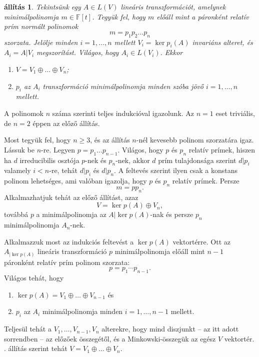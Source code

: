 \documentclass[a4paper, showtrims]{memoir}
\makeatletter
\renewenvironment{proof}[1][\proofname]
    {\par\pushQED{\qed}%
    \normalfont \topsep6\p@\@plus6\p@\relax
    \trivlist
    \item[\hskip\labelsep
        \itshape
    #1\@addpunct{:}]\ignorespaces}
    {\popQED\endtrivlist\@endpefalse}
\theoremstyle{plain}
\newtheorem{proposition}{állítás}[chapter]
\theoremstyle{remark}
\theoremstyle{definition}
\makeatother
\begin{document}
\begin{proposition}\label{pr:redukcio-primszorzat}
	Tekintsünk egy $A\in L\left( V \right)$ lineáris transzformációt,
	amelynek minimálpolinomja $m\in\mathbb{F}\left[ t \right]$.
	Tegyük fel, hogy $m$ előáll mint a páronként relatív prím
	normált polinomok
	\[
		m=p_1p_2\ldots p_n
	\]
	szorzata.
	Jelölje minden $i=1,\ldots,n$ mellett $V_i=\ker p_i\left( A \right)$
	invariáns alteret, és $A_i=A|V_i$ megszorítást.
	Világos, hogy $A_i\in L\left( V_i \right)$.
	Ekkor
	\begin{enumerate}
		\item $V=V_1\oplus\ldots\oplus V_n$;
		\item $p_i$ az $A_i$ transzformáció minimálpolinomja minden szóba jövő
		      $i=1,\ldots,n$ mellett.\qedhere
	\end{enumerate}
\end{proposition}
\begin{proof}
	A polinomok $n$ száma szerinti teljes indukcióval igazolunk.
	Az $n=1$ eset triviális, de $n=2$ éppen az előző állítás.

	Most tegyük fel, hogy $n\geq 3$, és az állítás $n$-nél kevesebb polinom szorzatára igaz.
	Lássuk be $n$-re.
	Legyen $p=p_1\ldots p_{n-1}$.
	Világos, hogy $p$ és $p_n$ relatív prímek, hiszen ha $d$ irreducibilis osztója
	$p$-nek és $p_n$-nek,
	akkor $d$ prím tulajdonsága szerint $d|p_i$ valamely $i<n$-re,
	tehát $d|p_i$ és $d|p_n$.
	A feltevés szerint ilyen csak a konstans polinom lehetséges,
	ami valóban igazolja, hogy $p$ és $p_n$ relatív prímek.
	Persze
	\[
		m=pp_n.
	\]
	Alkalmazhatjuk tehát az előző állítást, azaz
	\[
		V=\ker p\left( A \right)\oplus V_n,
	\]
	továbbá $p$ a minimálpolinomja az $A|\ker p\left( A \right)$-nak
	és persze $p_n$ minimálpolinomja $A_n$-nek.

	Alkalmazzuk most az indukciós feltevést a $\ker p\left( A \right)$ vektortérre.
	Ott az $A_{|\ker p\left( A \right)}$ lineáris transzformáció $p$ minimálpolinomja
	előáll mint $n-1$ páronként relatív prím polinom szorzata:
	\[
		p=p_1\cdots p_{n-1}.
	\]
	Világos tehát, hogy
	\begin{enumerate}
		\item
		      $\ker p\left( A \right)=V_1\oplus\ldots\oplus V_{n-1}$ és
		\item $p_i$ az $A_i$ minimálpolinomja minden $i=1,\ldots,n-1$ mellett.
	\end{enumerate}
	Teljesül tehát a $V_1,\ldots,V_{n-1},V_n$ alterekre,
	hogy mind diszjunkt -- az itt adott sorrendben -- az előzőek összegétől,
	és a Minkowski-összegük az egész $V$ vektortér.
    . állítás szerint tehát $V=V_1\oplus\ldots\oplus V_n$.
\end{proof}
\end{document}
